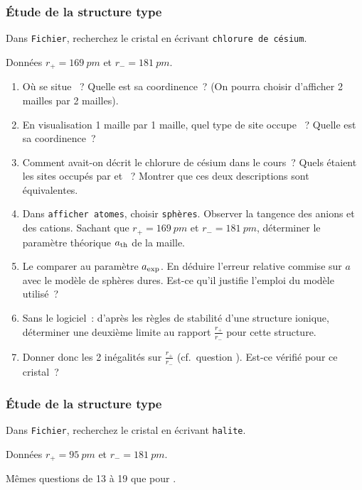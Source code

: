 \documentclass[a4paper, 10pt, final, garamond]{book}
\begin{document}
\subsubsection{Étude de la structure type }
\label{sssec:cscl}
Dans \texttt{Fichier}, recherchez le cristal  en écrivant
\texttt{chlorure de césium}.
\begin{rdefi}{Données}
  $r_{+} = \SI{169}{pm}$ et $r_{-} = \SI{181}{pm}$.
\end{rdefi}
\begin{enumerate}[label=\sqenumi, start=6]
  \item Où se situe ~? Quelle est sa coordinence~? (On pourra choisir
    d'afficher 2 mailles par 2 mailles).
  \item En visualisation 1 maille par 1 maille, quel type de site occupe
    ~? Quelle est sa coordinence~?
  \item Comment avait-on décrit le chlorure de césium dans le cours~? Quels
    étaient les sites occupés par  et ~? Montrer que ces deux
    descriptions sont équivalentes.
  \item Dans \texttt{afficher atomes}, choisir \texttt{sphères}. Observer la
    tangence des anions et des cations. Sachant que $r_{+} = \SI{169}{pm}$ et
    $r_{-} = \SI{181}{pm}$, déterminer le paramètre théorique $a_{\rm th}$ de la
    maille.
  \item Le comparer au paramètre $a_{\rm exp}$. En déduire l'erreur relative
    commise sur $a$ avec le modèle de sphères dures. Est-ce qu'il justifie
    l'emploi du modèle utilisé~?
  \item Sans le logiciel~: d'après les règles de stabilité d'une structure
    ionique, déterminer une deuxième limite au rapport $\frac{r_{+}}{r_{-}}$
    pour cette structure.
  \item Donner donc les 2 inégalités sur $\frac{r_{+}}{r_{-}}$ (cf.\ question
    ). Est-ce vérifié pour ce cristal~?
\end{enumerate}

\subsubsection{Étude de la structure type }
\label{sssec:nacl}
Dans \texttt{Fichier}, recherchez le cristal  en écrivant \texttt{halite}.
\begin{rdefi}{Données}
  $r_{+} = \SI{95}{pm}$ et $r_{-} = \SI{181}{pm}$.
\end{rdefi}
\begin{center}
  \begin{framed}
    \large
    Mêmes questions de 13 à 19 que pour .
  \end{framed}
\end{center}
\end{document}
